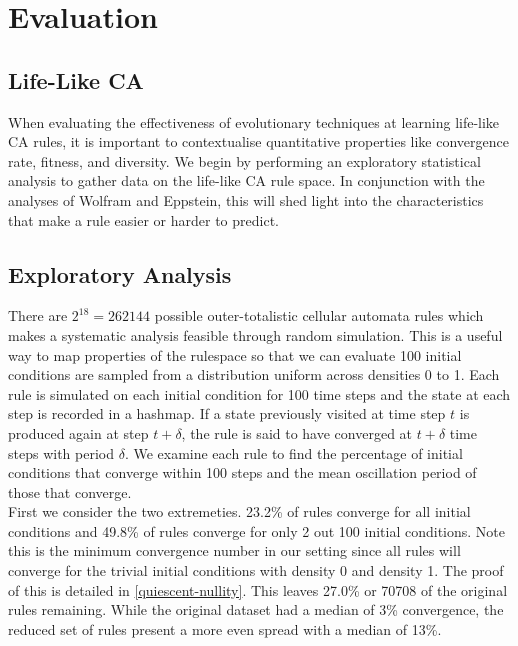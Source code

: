 \chapter{Evaluation} \label{evaluation}

\section{Life-Like CA}

When evaluating the effectiveness of evolutionary techniques at learning life-like CA rules, it is important to contextualise quantitative properties like convergence rate, fitness, and diversity. We begin by performing an exploratory statistical analysis to gather data on the life-like CA rule space. In conjunction with the analyses of Wolfram\cite{wolfram1986theory} and Eppstein\cite{eppstein2010growth}, this will shed light into the characteristics that make a rule easier or harder to predict.

\section{Exploratory Analysis}
There are $2^{18} = 262144$ possible outer-totalistic cellular automata rules which makes a systematic analysis feasible through random simulation. This is a useful way to map properties of the rulespace so that we can evaluate  100 initial conditions are sampled from a distribution uniform across densities 0 to 1. Each rule is simulated on each initial condition for 100 time steps and the state at each step is recorded in a hashmap. If a state previously visited at time step $t$ is produced again at step $t+\delta$, the rule is said to have converged at $t+\delta$ time steps with period $\delta$. We examine each rule to find the percentage of initial conditions that converge within 100 steps and the mean oscillation period of those that converge.\\

First we consider the two extremeties. 23.2\% of rules converge for all initial conditions and 49.8\% of rules converge for only 2 out 100 initial conditions. Note this is the minimum convergence number in our setting since all rules will converge for the trivial initial conditions with density 0 and density 1. The proof of this is detailed in \ref{quiescent-nullity}. This leaves 27.0\% or 70708 of the original rules remaining. While the original dataset had a median of 3\% convergence, the reduced set of rules present a more even spread with a median of 13\%.

